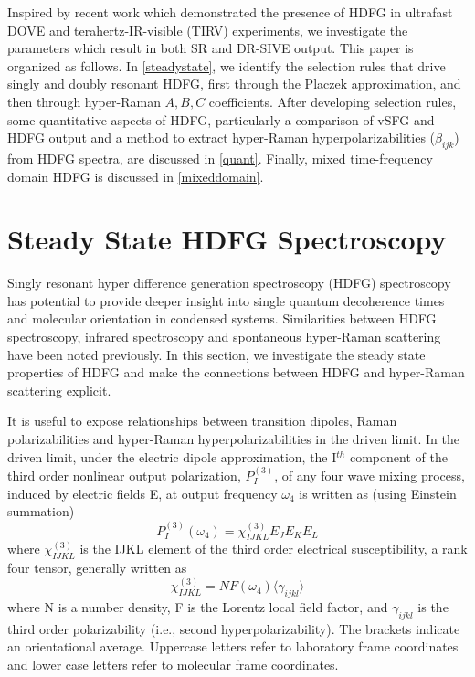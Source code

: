 \documentclass[aip, jcp, reprint, onecolumn]{revtex4-2}
\begin{document}
Inspired by recent work which demonstrated the presence of HDFG in ultrafast DOVE and terahertz-IR-visible (TIRV) experiments, we investigate the parameters which result in both SR and DR-SIVE output. \cite{Cho2000, Bonn2024, McDonnell2024}
This paper is organized as follows.
In \autoref{steadystate}, we identify the selection rules that drive singly and doubly resonant HDFG, first through the Placzek approximation, and then through hyper-Raman $A,B,C$ coefficients.
After developing selection rules, some quantitative aspects of HDFG, particularly a comparison of vSFG and HDFG output and a method to extract hyper-Raman hyperpolarizabilities ($\beta_{ijk}$) from HDFG spectra, are discussed in \autoref{quant}.
Finally, mixed time-frequency domain HDFG is discussed in \autoref{mixeddomain}. 

\section{Steady State HDFG Spectroscopy}\label{steadystate}

Singly resonant hyper difference generation spectroscopy (HDFG) spectroscopy has potential to provide deeper insight into single quantum decoherence times and molecular orientation in condensed systems.
Similarities between HDFG spectroscopy, infrared spectroscopy and spontaneous hyper-Raman scattering have been noted previously. \cite{RN352, Bonn2024, McDonnell2024}
In this section, we investigate the steady state properties of HDFG and make the connections between HDFG and hyper-Raman scattering explicit.

It is useful to expose relationships between transition dipoles, Raman polarizabilities and hyper-Raman hyperpolarizabilities in the driven limit. \cite{Simpson2004}
In the driven limit, under the electric dipole approximation, the I$^{th}$ component of the third order nonlinear output polarization, ${P}^{(3)}_I$, of any four wave mixing process, induced by electric fields E, at output frequency $\omega_4$ is written as (using Einstein summation) \cite{RN307}
\begin{equation} \label{polarization}
{P}^{(3)}_I (\omega_4)  = \chi^{(3)}_{IJKL} E_J E_K E_L 
\end{equation}
where $\chi^{(3)}_{IJKL}$ is the IJKL element of the third order electrical susceptibility, a rank four tensor, generally written as
\begin{equation}
	\chi^{(3)}_{IJKL} = NF(\omega_4) \langle \gamma_{ijkl} \rangle
\end{equation}
where N is a number density, F is the Lorentz local field factor, and $\gamma_{ijkl}$ is the third order polarizability (i.e., second hyperpolarizability). 
The brackets indicate an orientational average. 
Uppercase letters refer to laboratory frame coordinates and lower case letters refer to molecular frame coordinates.
\end{document}
